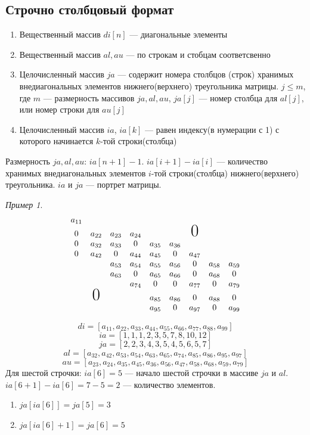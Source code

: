 \documentclass[oneside]{book}
\theoremstyle{plain}
\theoremstyle{remark}
\newtheorem*{examp}{Пример}
\theoremstyle{definition}
\begin{document}
\subsection{Строчно столбцовый формат}
\label{sec:org5efbdab}
\begin{enumerate}
\item Вещественный массив \(di[n]\) --- диагональные элементы
\item Вещественный массив \(al, au\) --- по строкам и стобцам соответсвенно
\item Целочисленный массив \(ja\) --- содержит номера столбцов (строк)
хранимых внедиагональных элементов нижнего(верхнего) треугольника
матрицы. \(j \le m\), где \(m\) --- размерность массивов \(ja, al, au\), \(ja[j]\) --- номер столбца для \(al[j]\), или номер строки для \(au[j]\)
\item Целочисленный массив \(ia\), \(ia[k]\) --- равен индексу(в нумерации с 1) с которого начинается \(k\)-той строки(столбца)
\end{enumerate}
Размерность \(ja, al, au\): \(ia[n + 1] - 1\). \(ia[i + 1] - ia[i]\) --- количество хранимых внедиагональных элементов \(i\)-той строки(столбца) нижнего(верхнего) треугольника. \(ia\) и \(ja\) --- портрет матрицы.

\begin{examp}
\-
\[ \begin{matrix}
a_{11} & & & & & & & & \\
0 & a_{22} & a_{23} & a_{24} & & &  \text{\huge0}& &  \\
0 & a_{32} & a_{33} & 0 & a_{35} & a_{36} & & &  \\
0 & a_{42} & 0 & a_{44} & a_{45} & 0 & a_{47} & &  \\
& & a_{53} & a_{54} & a_{55} & a_{56} & 0 & a_{58} & a_{59} \\
& & a_{63} & 0 & a_{65} & a_{66} & 0 & a_{68} & 0 \\
& & & a_{74} & 0 & 0 & a_{77} & 0 & a_{79} \\
& \text{\huge0}& &  & a_{85} & a_{86} & 0 & a_{88} & 0 \\
& & &  & a_{95} & 0 & a_{97} & 0 & a_{99}
\end{matrix} \]

\[ di = [a_{11}, a_{22}, a_{33}, a_{44}, a_{55}, a_{66}, a_{77}, a_{88}, a_{99}] \]
\[ ia = [1, 1, 1, 2, 3, 5, 7, 8, 10, 12] \]
\[ ja = [2, 2, 3, 4, 3, 5, 4, 5, 6, 5, 7] \]
\[ al = [a_{32}, a_{42}, a_{53}, a_{54}, a_{63}, a_{65}, a_{74}, a_{85}, a_{86}, a_{95}, a_{97}] \]
\[ au = [a_{23}, a_{24}, a_{35}, a_{45}, a_{36}, a_{56}, a_{47}, a_{58}, a_{68}, a_{59}, a_{79}] \]
Для шестой строчки: \(ia[6] = 5\) --- начало шестой строчки в массиве \(ja\) и \(al\). \(ia[6 + 1] - ia[6] = 7 - 5 = 2\) --- количество элементов.
\begin{enumerate}
\item \(ja[ia[6]] = ja[5] = 3\)
\item \(ja[ia[6] + 1] = ja[6] = 5\)
\end{enumerate}
\end{examp}
\end{document}
